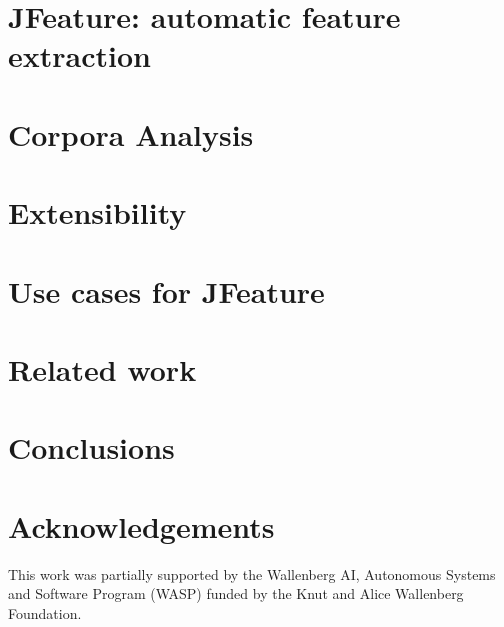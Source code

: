 \section{JFeature: automatic feature extraction}
\label{sec:jfeature}


\section{Corpora Analysis}
\label{sec:corpora}


\section{Extensibility}
\label{sec:extension}


\section{Use cases for JFeature}
\label{sec:discussion}


\section{Related work}
\label{sec:related-works}


\section{Conclusions}
\label{sec:conclusions}



\section*{Acknowledgements}

This work was partially supported by the Wallenberg AI, Autonomous Systems and Software Program (WASP) funded by the Knut and Alice Wallenberg Foundation.

{\raggedright
\printbibliography[segment=\therefsegment,heading=subbibliography]
}